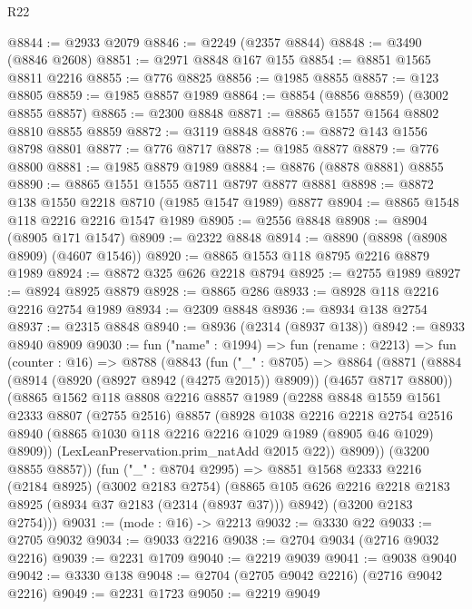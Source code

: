 \begin{lexlean}{R22}
\begin{coremodule}
@8844 := @2933 @2079
@8846 := @2249 (@2357 @8844)
@8848 := @3490 (@8846 @2608)
@8851 := @2971 @8848 @167 @155
@8854 := @8851 @1565 @8811 @2216
@8855 := @776 @8825
@8856 := @1985 @8855
@8857 := @123 @8805
@8859 := @1985 @8857 @1989
@8864 := @8854 (@8856 @8859) (@3002 @8855 @8857)
@8865 := @2300 @8848
@8871 := @8865 @1557 @1564 @8802 @8810 @8855 @8859
@8872 := @3119 @8848
@8876 := @8872 @143 @1556 @8798 @8801
@8877 := @776 @8717
@8878 := @1985 @8877
@8879 := @776 @8800
@8881 := @1985 @8879 @1989
@8884 := @8876 (@8878 @8881) @8855
@8890 := @8865 @1551 @1555 @8711 @8797 @8877 @8881
@8898 := @8872 @138 @1550 @2218 @8710 (@1985 @1547 @1989) @8877
@8904 := @8865 @1548 @118 @2216 @2216 @1547 @1989
@8905 := @2556 @8848
@8908 := @8904 (@8905 @171 @1547)
@8909 := @2322 @8848
@8914 := @8890 (@8898 (@8908 @8909) (@4607 @1546))
@8920 := @8865 @1553 @118 @8795 @2216 @8879 @1989
@8924 := @8872 @325 @626 @2218 @8794
@8925 := @2755 @1989
@8927 := @8924 @8925 @8879
@8928 := @8865 @286
@8933 := @8928 @118 @2216 @2216 @2754 @1989
@8934 := @2309 @8848
@8936 := @8934 @138 @2754
@8937 := @2315 @8848
@8940 := @8936 (@2314 (@8937 @138))
@8942 := @8933 @8940 @8909
@9030 := fun ("name" : @1994) =>
  fun (rename : @2213) =>
  fun (counter : @16) =>
  @8788
    (@8843
      (fun ("_" : @8705) =>
      @8864
        (@8871
          (@8884 (@8914 (@8920 (@8927 @8942 (@4275 @2015)) @8909)) (@4657 @8717 @8800))
          (@8865
            @1562
            @118
            @8808
            @2216
            @8857
            @1989
            (@2288
              @8848
              @1559
              @1561
              @2333
              @8807
              (@2755 @2516)
              @8857
              (@8928
                @1038
                @2216
                @2218
                @2754
                @2516
                @8940
                (@8865 @1030 @118 @2216 @2216 @1029 @1989 (@8905 @46 @1029) @8909))
              (LexLeanPreservation.prim_natAdd @2015 @22))
            @8909))
        (@3200 @8855 @8857))
      (fun ("_" : @8704 @2995) =>
      @8851
        @1568
        @2333
        @2216
        (@2184 @8925)
        (@3002 @2183 @2754)
        (@8865 @105 @626 @2216 @2218 @2183 @8925 (@8934 @37 @2183 (@2314 (@8937 @37))) @8942)
        (@3200 @2183 @2754)))
@9031 := (mode : @16) -> @2213
@9032 := @3330 @22
@9033 := @2705 @9032
@9034 := @9033 @2216
@9038 := @2704 @9034 (@2716 @9032 @2216)
@9039 := @2231 @1709
@9040 := @2219 @9039
@9041 := @9038 @9040
@9042 := @3330 @138
@9048 := @2704 (@2705 @9042 @2216) (@2716 @9042 @2216)
@9049 := @2231 @1723
@9050 := @2219 @9049

\end{coremodule}
\end{lexlean}

